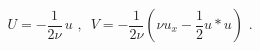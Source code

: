 \begin{equation}
U = -\frac{1}{2\nu}\,u\,\,, \,\,\,V = -\frac{1}{2\nu}(\nu u_x - \frac{1}{2}
u*u)\,\,.  \label{eq:pot}
\end{equation}

